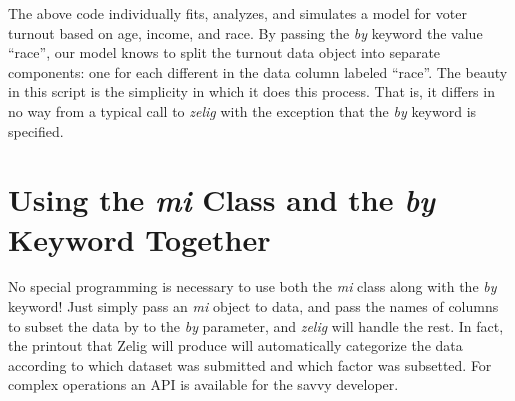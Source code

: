 \documentclass[a4paper,11pt]{article}
\begin{document}
The above code individually fits, analyzes, and simulates a model for voter turnout based on age, income, and race.  By passing the \emph{by} keyword the value ``race'', our model knows to split the turnout data object into separate components: one for each different in the data column labeled ``race''.  The beauty in this script is the simplicity in which it does this process.  That is, it differs in no way from a typical call to \emph{zelig} with the exception that the \emph{by} keyword is specified.

\section{Using the \emph{mi} Class and the \emph{by} Keyword Together}

No special programming is necessary to use both the \emph{mi} class along with the \emph{by} keyword!  Just simply pass an \emph{mi} object to data, and pass the names of columns to subset the data by to the \emph{by} parameter, and \emph{zelig} will handle the rest.  In fact, the printout that Zelig will produce will automatically categorize the data according to which dataset was submitted and which factor was subsetted.  For complex operations an API is available for the savvy developer.
\end{document}
